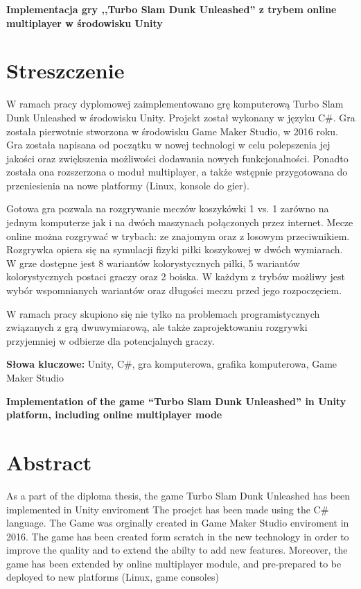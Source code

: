\newpage
\begin{center}
\large \bf
Implementacja gry ,,Turbo Slam Dunk Unleashed'' z trybem online multiplayer w środowisku Unity
\end{center}

\section*{Streszczenie}
W ramach pracy dyplomowej zaimplementowano grę komputerową Turbo Slam Dunk Unleashed w środowisku Unity. Projekt został wykonany w języku C\#. Gra została pierwotnie stworzona w środowisku Game Maker Studio, w 2016 roku. Gra została napisana od początku w nowej technologi w celu polepszenia jej jakości oraz zwiększenia możliwości dodawania nowych funkcjonalności. Ponadto została ona rozszerzona o moduł multiplayer, a także wstępnie przygotowana do przeniesienia na nowe platformy (Linux, konsole do gier).

Gotowa gra pozwala na rozgrywanie meczów koszykówki 1 vs. 1 zarówno na jednym komputerze jak i na dwóch maszynach połączonych przez internet. Mecze online można rozgrywać w trybach: ze znajomym oraz z losowym przeciwnikiem. Rozgrywka opiera się na symulacji fizyki piłki koszykowej w dwóch wymiarach. W grze dostępne jest 8 wariantów kolorystycznych piłki, 5 wariantów kolorystycznych postaci graczy oraz 2 boiska. W każdym z trybów możliwy jest wybór wspomnianych wariantów oraz długości meczu przed jego rozpoczęciem.

W ramach pracy skupiono się nie tylko na problemach programistycznych związanych z grą dwuwymiarową, ale także zaprojektowaniu rozgrywki przyjemniej w odbierze dla potencjalnych graczy.

\bigskip
{\noindent\bf Słowa kluczowe:} Unity, C\#, gra komputerowa, grafika komputerowa, Game Maker Studio

\vskip 2cm


\cleardoublepage
\newpage
\begin{center}
\large \bf
Implementation of the game ``Turbo Slam Dunk Unleashed'' in Unity platform, including online multiplayer mode 
\end{center}

\section*{Abstract}
As a part of the diploma thesis, the game Turbo Slam Dunk Unleashed has been implemented in Unity enviroment The proejct has been made using the C\# language. The Game was orginally created in Game Maker Studio enviroment in 2016. The game has been created form scratch in the new technology in order to improve the quality and to extend the abilty to add new features. Moreover, the game has been extended by online multiplayer module, and pre-prepared to be deployed to new platforms (Linux, game consoles)

